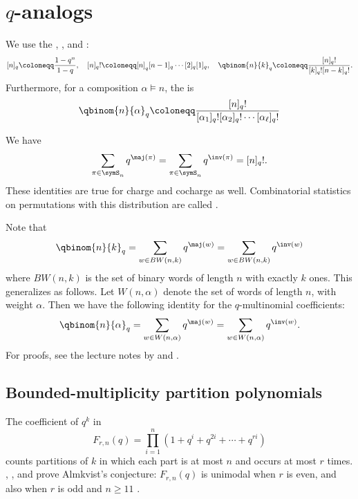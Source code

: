 

\section[qAnalogs]{$q$-analogs}

We use the \label{qInteger},
\label{qFactorial}, and
\label{qBinomialCoefficient}:
\[
[n]_q \coloneqq \frac{1-q^n}{1-q}, \quad
[n]_q! \coloneqq [n]_q [n-1]_q \dotsm [2]_q [1]_q, \quad
\qbinom{n}{k}_q \coloneqq \frac{[n]_q!}{[k]_q! [n-k]_q!}.
\]
Furthermore, for a composition $\alpha \vDash n$, the
\label{qMultinomialCoefficient} is
\[
\qbinom{n}{\alpha}_q \coloneqq \frac{[n]_q!}{[\alpha_1]_q! [\alpha_2]_q! \dotsm [\alpha_\ell]_q!}
\]

We have
\[
\sum_{\pi \in \symS_n} q^{\maj(\pi)} = \sum_{\pi \in \symS_n} q^{\inv(\pi)} = [n]_q!.
\]
These identities are true for charge and cocharge as well. Combinatorial
statistics on permutations with this distribution are called
\label{mahonianStatistic}.


Note that
\[
\qbinom{n}{k}_q = \sum_{w \in BW(n,k)} q^{\maj(w)} = \sum_{w \in BW(n,k)} q^{\inv(w)}
\]
where $BW(n,k)$ is the set of binary words of length $n$ with exactly $k$ ones.
This generalizes as follows. Let $W(n,\alpha)$ denote the set of words of length $n$,
with weight $\alpha$. Then we have the following identity
for the $q$-multinomial coefficients:
\[
\qbinom{n}{\alpha}_q = \sum_{w \in W(n,\alpha)} q^{\maj(w)} = \sum_{w \in W(n,\alpha)} q^{\inv(w)}.
\]
For proofs, see the lecture notes by  and
 \cite{FoataHan2011QSeries}.

\subsection[almkvistPartitionPolynomials]{Bounded-multiplicity partition polynomials}

The coefficient of $q^k$ in
\[
 F_{r,n}(q)=\prod_{i=1}^{n}(1+q^i+q^{2i}+\dotsb+q^{ri})
\]
counts partitions of $k$ in which each part is at most $n$ and occurs at most
$r$ times.  , , and  prove
Almkvist's conjecture: $F_{r,n}(q)$ is unimodal when $r$ is even, and also
when $r$ is odd and $n\geq11$ \cite[Thm.~1.3]{MaoShiZhu2026x}.

